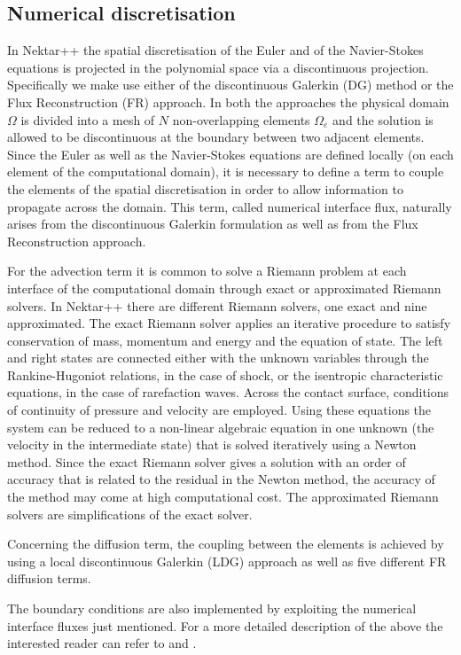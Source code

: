 \subsection{Numerical discretisation}
In Nektar++ the spatial discretisation of the Euler and of the Navier-Stokes 
equations is projected in the polynomial space via a discontinuous projection.
Specifically we make use either of the discontinuous Galerkin (DG) method 
or the Flux Reconstruction (FR) approach. 
In both the approaches the physical domain $\Omega$ is divided into a mesh 
of $N$ non-overlapping elements $\Omega_{e}$ and the solution is allowed 
to be discontinuous at the boundary between two adjacent elements. 
Since the Euler as well as the Navier-Stokes equations are defined locally 
(on each element of the computational domain), it is necessary to define 
a term to couple the elements of the spatial discretisation in order to allow 
information to propagate across the domain. This term, called numerical 
interface flux, naturally arises from the discontinuous Galerkin formulation 
as well as from the Flux Reconstruction approach. 

For the advection term it is common to solve a Riemann problem at each 
interface of the computational domain through exact or approximated Riemann
solvers. In Nektar++ there are different Riemann solvers, one exact and nine 
approximated. The exact Riemann solver applies an iterative procedure to 
satisfy conservation of mass, momentum and energy and the equation of 
state. The left and right states are connected either with the unknown variables 
through the Rankine-Hugoniot relations, in the case of shock, or the isentropic 
characteristic equations, in the case of rarefaction waves. Across the contact 
surface, conditions of continuity of pressure and velocity are employed. 
Using these equations the system can be reduced to a non-linear algebraic 
equation in one unknown (the velocity in the intermediate state) that is solved 
iteratively using a Newton method. Since the exact Riemann solver gives 
a solution with an order of accuracy that is related to the residual in the 
Newton method, the accuracy of the method may come at high computational 
cost. The approximated Riemann solvers are simplifications of the exact solver.

Concerning the diffusion term, the coupling between the elements is achieved 
by using a local discontinuous Galerkin (LDG) approach as well as five different 
FR diffusion terms.

The boundary conditions are also implemented by exploiting the numerical
interface fluxes just mentioned. 
For a more detailed description of the above the interested reader can refer 
to \cite{DeGMen14} and \cite{MenDeG14}.


